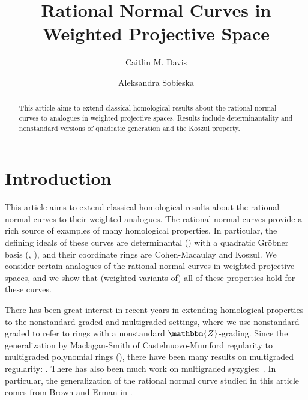 \documentclass[12pt,reqno]{amsart}
\title{Rational Normal Curves in Weighted Projective Space}
\author{Caitlin M. Davis}
\author{Aleksandra Sobieska}
\theoremstyle{definition}
\theoremstyle{remark}
\newcommand{\bbZ}{\mathbbm{Z}}
\begin{document}
\maketitle

\begin{abstract}
This article aims to extend classical homological results about the rational normal curves to analogues in weighted projective spaces.  Results include determinantality and nonstandard versions of quadratic generation and the Koszul property.
\end{abstract}



\section{Introduction}

This article aims to extend classical homological results about the rational normal curves to their weighted analogues.  The rational normal curves provide a rich source of examples of many homological properties. In particular, the defining ideals of these curves are determinantal (\cite[Proposition~6.1]{eGeomOSyz}) with a quadratic Gr\"obner basis (\cite{sGrobnerBasesConvexPolytopes, eInitialIdealsVeroneseSubrings}, \cite[Theorem~3.1.1]{cdrKoszulAlgRegularity}), and their coordinate rings are Cohen-Macaulay and Koszul.  We consider certain analogues of the rational normal curves in weighted projective spaces, and we show that (weighted variants of) all of these properties hold for these curves.

There has been great interest in recent years in extending homological properties to the nonstandard graded and multigraded settings, where we use nonstandard graded to refer to rings with a nonstandard $\bbZ$-grading. Since the generalization by Maclagan-Smith of Castelnuovo-Mumford regularity to multigraded polynomial rings (\cite{msMultigradedCMReg}), there have been many results on multigraded regularity: \cite{bcCMRegMultigradedIdeals,bhsCharacterizingMultigradedReg,bhsBoundsMultigradedReg,chmMultigradedTor,cnMultigradedRegCI,svwMultigradedRegCoarsenings}. There has also been much work on multigraded syzygies: \cite{beLinSyzOCurvesIWProjSp,bePositivityNonstdBetti,beTateRes,besVirtualRes,bklyHomologicalCombinatorial,bsShortResDiagonal,bcnMultigradedSylvesterForms,cSyzygiesCurvesProductsProjSpaces,eesTateResProductsProjSpace,hnvVirtualResPoints,hsMultigradedHilbertSchemes,hssSyzygiesMultigradedReg,svMultigradedRegSyzygiesFatPoints,yVirtualResMonomialIdeals}. In particular, the generalization of the rational normal curve studied in this article comes from Brown and Erman in \cite{beLinSyzOCurvesIWProjSp}. 
\end{document}

